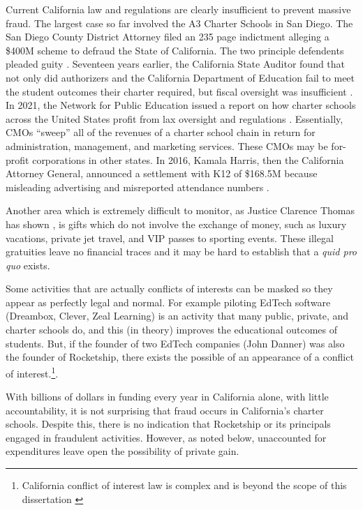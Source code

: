   Current California law and regulations are clearly insufficient to prevent massive fraud. The largest case so far involved the A3 Charter Schools in San Diego. The San Diego County District Attorney filed an 235 page indictment \parencite{SDDA2019} alleging a \$400M scheme to defraud the State of California. The two principle defendents pleaded guity \parencite{Taketa2021}.
  Seventeen years earlier, the California State Auditor found that not only did authorizers and the California Department of Education fail to meet the student outcomes their charter required, but fiscal oversight was insufficient \parencite{CAStateAuditor2002}. In 2021, the Network for Public Education issued a report on how charter schools across the United States profit from lax oversight and regulations \parencite{Burris.Cimarusti2021}. Essentially, CMOs ``sweep'' all of the revenues of a charter school chain in return for administration, management, and marketing services. These CMOs may be for-profit corporations in other states. In 2016, Kamala Harris, then the California Attorney General, announced a settlement with K12 of \$168.5M because misleading advertising and misreported attendance numbers \parencite{Agpressoffice2016}.

  Another area which is extremely difficult to monitor, as Justice Clarence Thomas has shown \parencite{Murphy.Mierjeski2023}, is gifts which do not involve the exchange of money, such as luxury vacations, private jet travel, and VIP passes to sporting events. These illegal gratuities leave no financial traces and it may be hard to establish that a \textit{quid pro quo} exists. 

  Some activities that are actually conflicts of interests can be masked so they appear as perfectly legal and normal. For example piloting EdTech software (Dreambox, Clever, Zeal Learning) is an activity that many public, private, and charter schools do, and this (in theory) improves the educational outcomes of students. But, if the founder of two EdTech companies (John Danner) was also the founder of Rocketship, there exists the possible of an appearance of a conflict of interest.\footnote{California conflict of interest law is complex and is beyond the scope of this dissertation \parencite{Chaney.etal2010a}}.

With billions of dollars in funding every year in California alone, with little accountability, it is not surprising that fraud occurs in California's charter schools. Despite this, there is no indication that Rocketship or its principals engaged in fraudulent activities. However, as noted below, unaccounted for expenditures leave open the possibility of private gain. 

